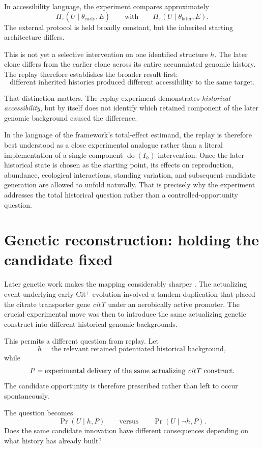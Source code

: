 \documentclass[11pt]{article}
\begin{document}
In accessibility language, the experiment compares approximately
\[
H_{\tau}(U\mid\theta_{\mathrm{early}},E)
\qquad\text{with}\qquad
H_{\tau}(U\mid\theta_{\mathrm{later}},E).
\]
The external protocol is held broadly constant, but the inherited starting architecture differs.

This is not yet a selective intervention on one identified structure $h$. The later clone differs from the earlier clone across its entire accumulated genomic history. The replay therefore establishes the broader result first:
\[
\boxed{\text{different inherited histories produced different accessibility to the same target}.}
\]

That distinction matters. The replay experiment demonstrates \emph{historical accessibility}, but by itself does not identify which retained component of the later genomic background caused the difference.

In the language of the framework's total-effect estimand, the replay is therefore best understood as a close experimental analogue rather than a literal implementation of a single-component $\operatorname{do}(I_h)$ intervention. Once the later historical state is chosen as the starting point, its effects on reproduction, abundance, ecological interactions, standing variation, and subsequent candidate generation are allowed to unfold naturally. That is precisely why the experiment addresses the total historical question rather than a controlled-opportunity question.

\section{Genetic reconstruction: holding the candidate fixed}

Later genetic work makes the mapping considerably sharper \cite{Blount2012}. The actualizing event underlying early Cit$^{+}$ evolution involved a tandem duplication that placed the citrate transporter gene \emph{citT} under an aerobically active promoter. The crucial experimental move was then to introduce the same actualizing genetic construct into different historical genomic backgrounds.

This permits a different question from replay. Let
\[
h=\text{the relevant retained potentiated historical background},
\]
while
\[
P=\text{experimental delivery of the same actualizing \emph{citT} construct}.
\]
The candidate opportunity is therefore prescribed rather than left to occur spontaneously.

The question becomes
\[
\Pr(U\mid h,P)
\qquad\text{versus}\qquad
\Pr(U\mid \neg h,P).
\]
Does the same candidate innovation have different consequences depending on what history has already built?
\end{document}
